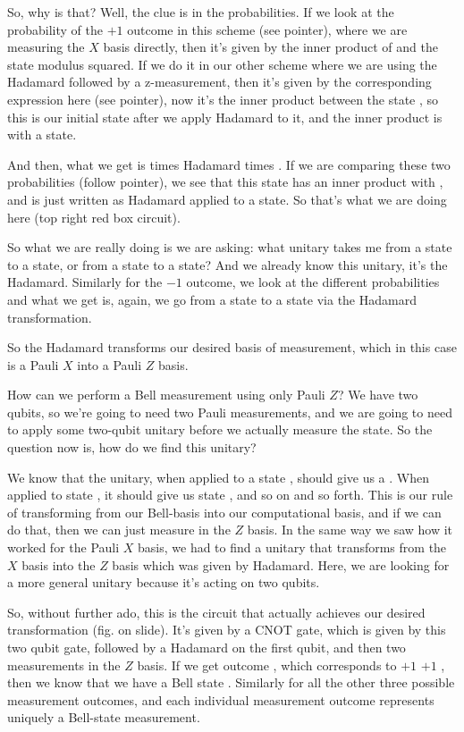 So, why is that? Well, the clue is in the probabilities. If we look at the probability of the $+1$ outcome in this scheme (see pointer), where we are measuring the $X$ basis directly, then it's given by the inner product of \ket{\psi} and the \ket{+} state modulus squared. If we do it in our other scheme where we are using the Hadamard followed by a z-measurement, then it's given by the corresponding expression here (see pointer), now it's the inner product between the state , so this is our initial state after we apply Hadamard to it, and the inner product is with a  state.

And then, what we get is \ket{\psi} times Hadamard times . If we are comparing these two probabilities (follow pointer), we see that this \ket{\psi} state has an inner product with \ket{+}, and \ket{+} is just written as Hadamard applied to a  state. So that's what we are doing here (top right red box circuit).

So what we are really doing is we are asking: what unitary takes me from a \ket{+} state to a  state, or from a  state to a \ket{+} state? And we already know this unitary, it's the Hadamard. Similarly for the  $-1$ outcome, we look at the different probabilities and what we get is, again, we go from a \ket{-} state to a  state via the Hadamard transformation.

So the Hadamard transforms our desired basis of measurement, which in this case is a Pauli $X$ into a Pauli $Z$ basis.

How can we perform a Bell measurement using only Pauli $Z$? We have two qubits, so we're going to need two Pauli measurements, and we are going to need to apply some two-qubit unitary before we actually measure the state. So the question now is, how do we find this unitary?

We know that the unitary, when applied to a state \ket{\Psi^+}, should give us a . When applied to state \ket{\Phi^-}, it should give us state , and so on and so forth. This is our rule of transforming from our Bell-basis into our computational basis, and if we can do that, then we can just measure in the $Z$ basis. In the same way we saw how it worked for the Pauli $X$ basis, we had to find a unitary that transforms from the $X$ basis into the $Z$ basis which was given by Hadamard. Here, we are looking for a more general unitary because it's acting on two qubits.

So, without further ado, this is the circuit that actually achieves our desired transformation (fig. on slide). It's given by a CNOT gate, which is given by this two qubit gate, followed by a Hadamard on the first qubit, and then two measurements in the $Z$ basis. If we get outcome , which corresponds to  $+1$  $+1$ , then we know that we have a Bell state \ket{\Phi^+}. Similarly for all the other three possible measurement outcomes, and each individual measurement outcome represents uniquely a Bell-state measurement.

